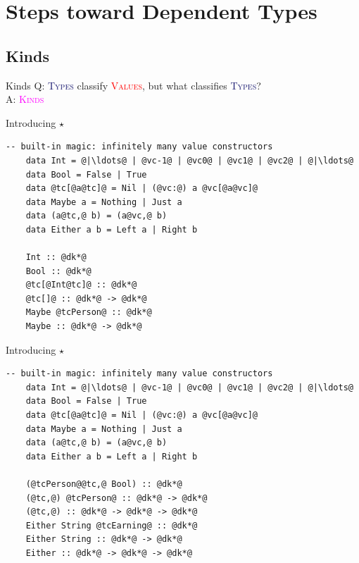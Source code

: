 \documentclass[xcolor={usenames,dvipsnames}]{beamer}
\newcommand{\htycon}[1]{\textcolor{MidnightBlue}{\textsc{#1}}}
\newcommand{\hvalcon}[1]{\textcolor{Red}{\textsc{#1}}}
\newcommand{\hkind}[1]{\textcolor{Fuchsia}{\textsc{#1}}}
\begin{document}
\section{Steps toward Dependent Types}

\subsection{Kinds}

\begin{frame}[fragile]{Kinds}
  Q: \htycon{Types} classify \hvalcon{Values}, but what classifies \htycon{Types}?\\
  A: \hkind{Kinds}
\end{frame}

\begin{frame}[fragile]{Introducing $\star$}
  \begin{lstlisting}[style=hask]
    -- built-in magic: infinitely many value constructors
    data Int = @|\ldots@ | @vc-1@ | @vc0@ | @vc1@ | @vc2@ | @|\ldots@
    data Bool = False | True
    data @tc[@a@tc]@ = Nil | (@vc:@) a @vc[@a@vc]@
    data Maybe a = Nothing | Just a
    data (a@tc,@ b) = (a@vc,@ b)
    data Either a b = Left a | Right b

    Int :: @dk*@
    Bool :: @dk*@
    @tc[@Int@tc]@ :: @dk*@
    @tc[]@ :: @dk*@ -> @dk*@
    Maybe @tcPerson@ :: @dk*@
    Maybe :: @dk*@ -> @dk*@
  \end{lstlisting}
\end{frame}

\begin{frame}[fragile]{Introducing $\star$}
  \begin{lstlisting}[style=hask]
    -- built-in magic: infinitely many value constructors
    data Int = @|\ldots@ | @vc-1@ | @vc0@ | @vc1@ | @vc2@ | @|\ldots@
    data Bool = False | True
    data @tc[@a@tc]@ = Nil | (@vc:@) a @vc[@a@vc]@
    data Maybe a = Nothing | Just a
    data (a@tc,@ b) = (a@vc,@ b)
    data Either a b = Left a | Right b

    (@tcPerson@@tc,@ Bool) :: @dk*@
    (@tc,@) @tcPerson@ :: @dk*@ -> @dk*@
    (@tc,@) :: @dk*@ -> @dk*@ -> @dk*@
    Either String @tcEarning@ :: @dk*@
    Either String :: @dk*@ -> @dk*@
    Either :: @dk*@ -> @dk*@ -> @dk*@
  \end{lstlisting}
\end{frame}
\end{document}
